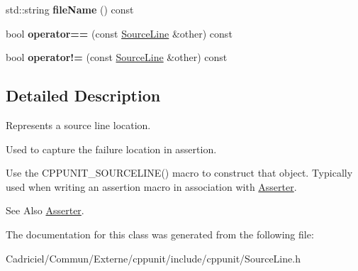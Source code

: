 \begin{DoxyCompactItemize}
\item 
\hypertarget{class_source_line_a1571a51d45ebcea382b86224ef767a2e}{std\-::string {\bfseries file\-Name} () const }\label{class_source_line_a1571a51d45ebcea382b86224ef767a2e}

\item 
\hypertarget{class_source_line_a6c9eff68161f364725b3a51fc60c3e01}{bool {\bfseries operator==} (const \hyperlink{class_source_line}{Source\-Line} \&other) const }\label{class_source_line_a6c9eff68161f364725b3a51fc60c3e01}

\item 
\hypertarget{class_source_line_aa4633f46f9c9f470c6b680327d002e86}{bool {\bfseries operator!=} (const \hyperlink{class_source_line}{Source\-Line} \&other) const }\label{class_source_line_aa4633f46f9c9f470c6b680327d002e86}

\end{DoxyCompactItemize}


\subsection{Detailed Description}
Represents a source line location.

Used to capture the failure location in assertion. 

Use the C\-P\-P\-U\-N\-I\-T\-\_\-\-S\-O\-U\-R\-C\-E\-L\-I\-N\-E() macro to construct that object. Typically used when writing an assertion macro in association with \hyperlink{struct_asserter}{Asserter}.

\begin{DoxySeeAlso}{See Also}
\hyperlink{struct_asserter}{Asserter}. 
\end{DoxySeeAlso}


The documentation for this class was generated from the following file\-:\begin{DoxyCompactItemize}
\item 
Cadriciel/\-Commun/\-Externe/cppunit/include/cppunit/Source\-Line.\-h\end{DoxyCompactItemize}
